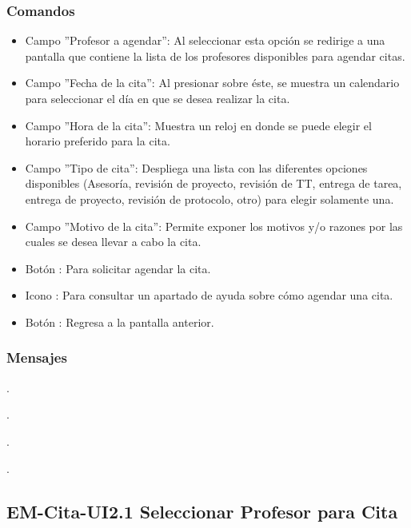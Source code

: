 \subsubsection{Comandos}
	\begin{itemize}
		\item Campo ''Profesor a agendar'': Al seleccionar esta opción se redirige a una pantalla que contiene la lista de los profesores disponibles para agendar citas.
		\item Campo ''Fecha de la cita'': Al presionar sobre éste, se muestra un calendario para seleccionar el día en que se desea realizar la cita.
		\item Campo ''Hora de la cita'': Muestra un reloj en donde se puede elegir el horario preferido para la cita.	
		\item Campo ''Tipo de cita'': Despliega una lista con las diferentes opciones disponibles (Asesoría, revisión de proyecto, revisión de TT, entrega de tarea, entrega de proyecto, revisión de protocolo, otro) para elegir solamente una. 
		\item Campo ''Motivo de la cita'': Permite exponer los motivos y/o razones por las cuales se desea llevar a cabo la cita.	
		\item Botón : Para solicitar agendar la cita.
		\item Icono : Para consultar un apartado de ayuda sobre cómo agendar una cita.
		\item Botón : Regresa a la pantalla anterior.
	\end{itemize}

\subsubsection{Mensajes}
	\begin{Citemize}
		\item {}.
		\item {}.
		\item {}.
		\item {}.
	\end{Citemize}

\pagebreak

\subsection{EM-Cita-UI2.1 Seleccionar Profesor para Cita }

